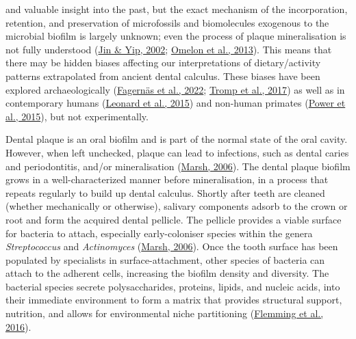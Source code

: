\documentclass[
  b5paper,
]{book}
\begin{document}
and valuable insight into the past, but the exact mechanism of the
incorporation, retention, and preservation of microfossils and
biomolecules exogenous to the microbial biofilm is largely unknown; even
the process of plaque mineralisation is not fully understood
(\protect\hyperlink{ref-jinSupragingivalCalculus2002}{Jin \& Yip, 2002};
\protect\hyperlink{ref-omelonReviewPhosphate2013}{Omelon et al., 2013}).
This means that there may be hidden biases affecting our interpretations
of dietary/activity patterns extrapolated from ancient dental calculus.
These biases have been explored archaeologically
(\protect\hyperlink{ref-fagernasMicrobialBiogeography2022}{Fagernäs et
al., 2022}; \protect\hyperlink{ref-trompEDTACalculus2017}{Tromp et al.,
2017}) as well as in contemporary humans
(\protect\hyperlink{ref-leonardPlantMicroremains2015}{Leonard et al.,
2015}) and non-human primates
(\protect\hyperlink{ref-powerChimpCalculus2015}{Power et al., 2015}),
but not experimentally.

Dental plaque is an oral biofilm and is part of the normal state of the
oral cavity. However, when left unchecked, plaque can lead to
infections, such as dental caries and periodontitis, and/or
mineralisation (\protect\hyperlink{ref-marshDentalPlaque2006}{Marsh,
2006}). The dental plaque biofilm grows in a well-characterized manner
before mineralisation, in a process that repeats regularly to build up
dental calculus. Shortly after teeth are cleaned (whether mechanically
or otherwise), salivary components adsorb to the crown or root and form
the acquired dental pellicle. The pellicle provides a viable surface for
bacteria to attach, especially early-coloniser species within the genera
\emph{Streptococcus} and \emph{Actinomyces}
(\protect\hyperlink{ref-marshDentalPlaque2006}{Marsh, 2006}). Once the
tooth surface has been populated by specialists in surface-attachment,
other species of bacteria can attach to the adherent cells, increasing
the biofilm density and diversity. The bacterial species secrete
polysaccharides, proteins, lipids, and nucleic acids, into their
immediate environment to form a matrix that provides structural support,
nutrition, and allows for environmental niche partitioning
(\protect\hyperlink{ref-flemmingBiofilmsEmergent2016}{Flemming et al.,
2016}).
\end{document}
